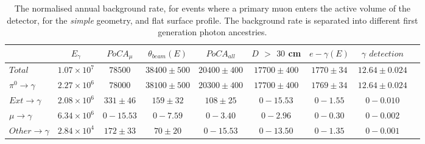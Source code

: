 \begin{table}
  \caption[The normalised annual background rate, for events where a primary muon enters the active volume of the detector, for the \emph{simple} geometry, and flat surface profile]
          {The normalised annual background rate, for events where a primary muon enters the active volume of the detector, for the \emph{simple} geometry, and flat surface profile. The background rate is separated into different first generation photon ancestries.}
  \label{tab:SurfMuSimp}
  \centering
  \scriptsize
  \begin{tabular}{l c c c c c c c c }
    \toprule
        & $E_\gamma$ & $PoCA_\mu$ & $\theta_{beam}(E)$ & $PoCA_{all}$ & $D$ $>$ $30$ cm & $e-\gamma(E)$ & $\gamma$ $detection$ \\
        \midrule
        $Total$          & $1.07\times10^7$ & $78500$    & $38400\pm500$ & $20400\pm400$ & $17700\pm400$ & $1770\pm34$ & $12.64\pm0.024$ \\

        $\pi^0\to\gamma$ & $2.27\times10^6$ & $78000$    & $38100\pm500$ & $20300\pm400$ & $17700\pm400$ & $1769\pm34$ & $12.64\pm0.024$ \\

        $Ext\to\gamma$   & $2.08\times10^6$ & $331\pm46$ & $159\pm32$    & $108\pm25$    & $0-15.53$     & $0-1.55$    & $0-0.010$ \\

        $\mu\to\gamma$   & $6.34\times10^6$ & $0-15.53$  & $0-7.59$      & $0-3.40$      & $0-2.96$      & $0-0.30$    & $0-0.002$ \\

        $Other\to\gamma$ & $2.84\times10^4$ & $172\pm33$ & $70\pm20$     & $0-15.53$     & $0-13.50$     & $0-1.35$    & $0-0.001$ \\
        \bottomrule
  \end{tabular}
\end{table}

